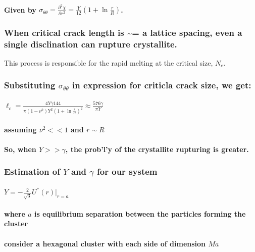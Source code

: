 \documentclass{umthesis}
\begin{document}
\paragraph{Given by $\sigma_{\theta \theta}= \frac{\partial^2 \chi}{\partial r^2}=  \frac{Y}{12} \left(1 + \ln \frac{r}{R} \right )$.}
\label{sec-2.1.5.4.5}
\subsubsection{When critical crack length is \~{}= a lattice spacing, even a single disclination can rupture crystallite.}
\label{sec-2.1.5.5}

This process is responsible for the rapid melting at the critical size, $N_c$.
\subsubsection{Substituting  $\sigma_{\theta \theta}$ in expression for criticla crack size, we get:}
\label{sec-2.1.5.6}
\paragraph{$\ell_c = \frac{ 4 Y \gamma 144}{\pi (1-\nu^2) Y^2 (1+ \ln \frac{r}{R})^2} \approx \frac{576 \gamma}{\pi Y}$}
\label{sec-2.1.5.6.1}
\paragraph{assuming $\nu^2 << 1$ and $r \sim R$}
\label{sec-2.1.5.6.2}
\paragraph{So, when $Y >> \gamma$, the prob'l'y of the crystallite rupturing is greater.}
\label{sec-2.1.5.6.3}
\subsubsection{Estimation of $Y$ and $\gamma$ for our system}
\label{sec-2.1.5.7}
\paragraph{$Y = - \frac{2}{\sqrt{3}} U^{''}(r)|_{r=a}$}
\label{sec-2.1.5.7.1}
\paragraph{where $a$ is equilibrium separation between the particles forming the cluster}
\label{sec-2.1.5.7.2}
\paragraph{consider a hexagonal cluster with each side of dimension $M a$}
\label{sec-2.1.5.7.3}
\end{document}
